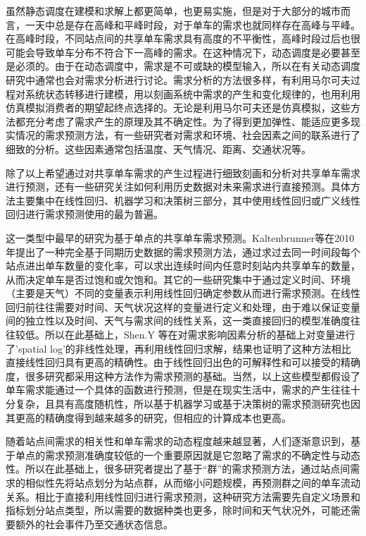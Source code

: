 \documentclass[]{tongjithesis}
\numberwithin{equation}{chapter}
\begin{document}
虽然静态调度在建模和求解上都更简单，也更易实施，但是对于大部分的城市而言，一天中总是存在高峰和平峰时段，对于单车的需求也就同样存在高峰与平峰。在高峰时段，不同站点间的共享单车需求具有高度的不平衡性，高峰时段过后也很可能会导致单车分布不符合下一高峰的需求。在这种情况下，动态调度是必要甚至是必须的。由于在动态调度中，需求是不可或缺的模型输入，所以在有关动态调度研究中通常也会对需求分析进行讨论。需求分析的方法很多样，有利用马尔可夫过程对系统状态转移进行建模，用以刻画系统中需求的产生和变化规律的\cite{schuijbroek2017inventory}，也用利用仿真模拟消费者的期望起终点选择的\cite{caggiani2013dynamic}。无论是利用马尔可夫还是仿真模拟，这些方法都充分考虑了需求产生的原理及其不确定性。为了得到更加弹性、能适应更多现实情况的需求预测方法，有一些研究者对需求和环境、社会因素之间的联系进行了细致的分析。这些因素通常包括温度、天气情况、距离、交通状况等\cite{frade2014bicycle,faghih2014land}。

除了以上希望通过对共享单车需求的产生过程进行细致刻画和分析对共享单车需求进行预测，还有一些研究关注如何利用历史数据对未来需求进行直接预测。具体方法主要集中在线性回归、机器学习和决策树三部分，其中使用线性回归或广义线性回归进行需求预测使用的最为普遍。

这一类型中最早的研究为基于单点的共享单车需求预测。Kaltenbrunner等在2010年提出了一种完全基于同期历史数据的需求预测方法\cite{kaltenbrunner2010urban}，通过求过去同一时间段每个站点进出单车数量的变化率，可以求出连续时间内任意时刻站内共享单车的数量，从而决定单车是否过饱和或欠饱和。其它的一些研究集中于通过定义时间、环境（主要是天气）不同的变量表示利用线性回归确定参数从而进行需求预测。在线性回归前往往需要对时间、天气状况这样的变量进行定义和处理，由于难以保证变量间的独立性以及时间、天气与需求间的线性关系，这一类直接回归的模型准确度往往较低。所以在此基础上，Shen.Y 等在对需求影响因素分析的基础上对变量进行了’spatial log’的非线性处理，再利用线性回归求解，结果也证明了这种方法相比直接线性回归具有更高的精确性\cite{shen2018understanding}。由于线性回归出色的可解释性和可以接受的精确度，很多研究都采用这种方法作为需求预测的基础。当然，以上这些模型都假设了单车需求能通过一个具体的函数进行预测，但是在现实生活中，需求的产生往往十分复杂，且具有高度随机性，所以基于机器学习\cite{xu2020hybrid}或基于决策树\cite{ve2020rule}的需求预测研究也因其更高的精确度得到越来越多的研究，但相应的计算成本也更高。

随着站点间需求的相关性和单车需求的动态程度越来越显著，人们逐渐意识到，基于单点的需求预测准确度较低的一个重要原因就是它忽略了需求的不确定性与动态性。所以在此基础上，很多研究者提出了基于“群”的需求预测方法\cite{chen2016dynamic,hulot2018towards}，通过站点间需求的相似性先将站点划分为站点群，从而缩小问题规模，再预测群之间的单车流动关系。相比于直接利用线性回归进行需求预测，这种研究方法需要先自定义场景和指标划分站点类型，所以需要的数据种类也更多，除时间和天气状况外，可能还需要额外的社会事件乃至交通状态信息。
\end{document}
